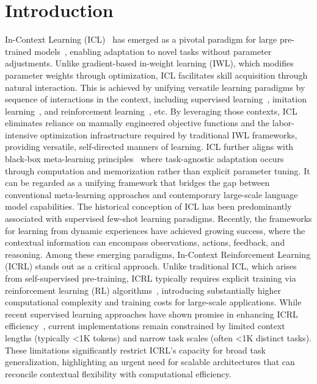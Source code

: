 \documentclass{article}
\renewcommand{\cite}[1]{\citep{#1}}
\begin{document}
\section{Introduction}
In-Context Learning (ICL)~\cite{brown2020language} has emerged as a pivotal paradigm for large pre-trained models~\cite{radford2021learning,driess2023palm,touvron2023llama,achiam2023gpt}, enabling adaptation to novel tasks without parameter adjustments. Unlike gradient-based in-weight learning (IWL), which modifies parameter weights through optimization, ICL facilitates skill acquisition through natural interaction. This is achieved by unifying versatile learning paradigms by sequence of interactions in the context, including supervised learning~\cite{santoro2016meta,garg2022can}, imitation learning~\cite{reed2022generalist,fucontext,vosyliusfew}, and reinforcement learning~\cite{wang2016learning,duan2016rl,laskin2022context}, etc. By leveraging those contexts, ICL eliminates reliance on manually engineered objective functions and the labor-intensive optimization infrastructure required by traditional IWL frameworks, providing versatile, self-directed manners of learning. ICL further aligns with black-box meta-learning principles~\cite{koch2015siamese,wang2016learning} where task-agnostic adaptation occurs through computation and memorization rather than explicit parameter tuning. It can be regarded as a unifying framework that bridges the gap between conventional meta-learning approaches and contemporary large-scale language model capabilities.
The historical conception of ICL has been predominantly associated with supervised few-shot learning paradigms. Recently, the frameworks for learning from dynamic experiences have achieved growing success, where the contextual information can encompass observations, actions, feedback, and reasoning. Among these emerging paradigms, In-Context Reinforcement Learning (ICRL) stands out as a critical approach. Unlike traditional ICL, which arises from self-supervised pre-training, ICRL typically requires explicit training via reinforcement learning (RL) algorithms~\cite{duan2016rl}, introducing substantially higher computational complexity and training costs for large-scale applications. While recent supervised learning approaches have shown promise in enhancing ICRL efficiency~\cite{laskin2022context,zisman2023emergence,lee2024supervised}, current implementations remain constrained by limited context lengths (typically <1K tokens) and narrow task scales (often <1K distinct tasks). These limitations significantly restrict ICRL's capacity for broad task generalization, highlighting an urgent need for scalable architectures that can reconcile contextual flexibility with computational efficiency.
\end{document}
